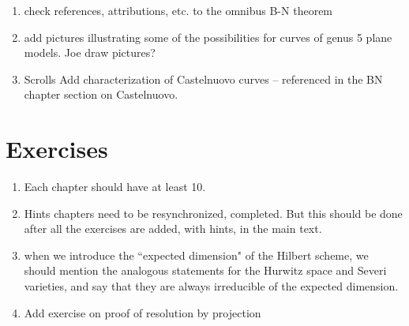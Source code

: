 \documentclass[12pt, leqno]{book}
\begin{document}
\begin{enumerate}
\item {check references, attributions, etc.} to the omnibus B-N theorem


\item add pictures illustrating some of the possibilities for curves of genus 5  plane models. Joe draw pictures?

\item{Scrolls}
Add characterization of Castelnuovo curves -- referenced in the BN chapter section on Castelnuovo.


\end{enumerate}
\section{Exercises}

\begin{enumerate}
\item Each chapter should have at least 10. 
\item Hints chapters need to be resynchronized, completed. But this should be done after all the exercises are added, with
hints, in the main text.

 \item when we introduce the ``expected dimension" of the Hilbert scheme, we should mention the analogous statements for the Hurwitz space and Severi varieties, and say that they are always irreducible of the expected dimension.


\item Add exercise on proof of resolution by projection 

\end{enumerate}
\end{document}
